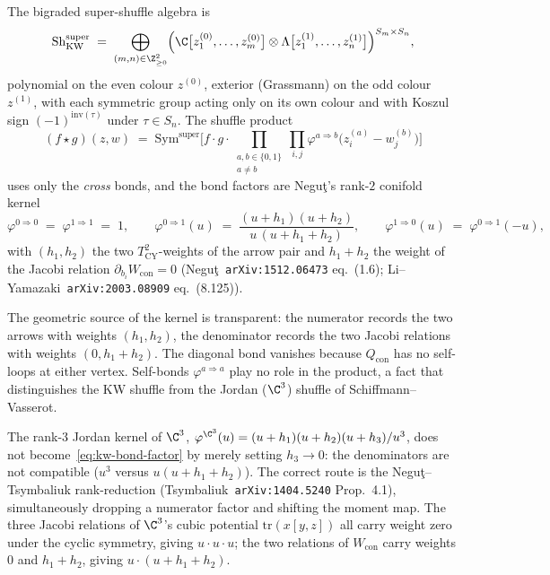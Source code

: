 \begin{definition}
\label{def:kw-super-shuffle}
The bigraded super-shuffle algebra is
\begin{equation}
\label{eq:kw-super-shuffle}
 \mathrm{Sh}^{\mathrm{super}}_{\mathrm{KW}}
 \;=\; \bigoplus_{(m, n) \in \Z^2_{\geq 0}}
 \Bigl(\C\bigl[z^{(0)}_1, \ldots, z^{(0)}_m\bigr]
 \otimes \Lambda\bigl[z^{(1)}_1, \ldots, z^{(1)}_n\bigr]\Bigr)^{S_m \times S_n},
\end{equation}
polynomial on the even colour $z^{(0)}$, exterior (Grassmann) on the odd colour $z^{(1)}$, with each symmetric group acting only on its own colour and with Koszul sign $(-1)^{\mathrm{inv}(\tau)}$ under $\tau \in S_n$. The shuffle product
\[
 (f \star g)(z, w) \;=\;
 \mathrm{Sym}^{\mathrm{super}}\!\Biggl[
 f \cdot g \cdot
 \prod_{\substack{a, b \in \{0, 1\} \\ a \neq b}}
 \prod_{i, j}
 \varphi^{a \Rightarrow b}\!\bigl(z^{(a)}_i - w^{(b)}_j\bigr)
 \Biggr]
\]
uses only the \emph{cross} bonds, and the bond factors are Negu\c{t}'s rank-$2$ conifold kernel
\begin{equation}
\label{eq:kw-bond-factor}
 \varphi^{0 \Rightarrow 0} \;=\; \varphi^{1 \Rightarrow 1} \;=\; 1,
 \qquad
 \varphi^{0 \Rightarrow 1}(u) \;=\;
 \frac{(u + h_1)(u + h_2)}{u\,(u + h_1 + h_2)},
 \qquad
 \varphi^{1 \Rightarrow 0}(u) \;=\; \varphi^{0 \Rightarrow 1}(-u),
\end{equation}
with $(h_1, h_2)$ the two $T^2_{\mathrm{CY}}$-weights of the arrow pair and $h_1 + h_2$ the weight of the Jacobi relation $\partial_{b_i} W_{\mathrm{con}} = 0$ (Negu\c{t}~\texttt{arXiv:1512.06473} eq.~(1.6); Li--Yamazaki~\texttt{arXiv:2003.08909} eq.~(8.125)).
\end{definition}

The geometric source of the kernel is transparent: the numerator records the two arrows with weights $(h_1, h_2)$, the denominator records the two Jacobi relations with weights $(0, h_1 + h_2)$. The diagonal bond vanishes because $Q_{\mathrm{con}}$ has no self-loops at either vertex. Self-bonds $\varphi^{a \Rightarrow a}$ play no role in the product, a fact that distinguishes the KW shuffle from the Jordan ($\C^3$) shuffle of Schiffmann--Vasserot.

\begin{remark}
\label{rem:rank3-to-rank2}
The rank-$3$ Jordan kernel of $\C^3$, $\varphi^{\C^3}(u) = (u + h_1)(u + h_2)(u + h_3)/u^3$, does not become~\eqref{eq:kw-bond-factor} by merely setting $h_3 \to 0$: the denominators are not compatible ($u^3$ versus $u(u + h_1 + h_2)$). The correct route is the Negu\c{t}--Tsymbaliuk rank-reduction (Tsymbaliuk~\texttt{arXiv:1404.5240} Prop.~4.1), simultaneously dropping a numerator factor and shifting the moment map. The three Jacobi relations of $\C^3$'s cubic potential $\mathrm{tr}(x[y,z])$ all carry weight zero under the cyclic symmetry, giving $u \cdot u \cdot u$; the two relations of $W_{\mathrm{con}}$ carry weights $0$ and $h_1 + h_2$, giving $u \cdot (u + h_1 + h_2)$.
\end{remark}

